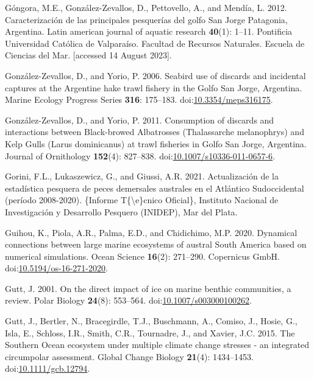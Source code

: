 \documentclass[
]{article}
\newlength{\cslhangindent}
\newenvironment{CSLReferences}[2] %
 {\begin{list}{}{%
  \setlength{\itemindent}{0pt}
  \setlength{\leftmargin}{0pt}
  \setlength{\parsep}{0pt}
  \ifodd #1
   \setlength{\leftmargin}{\cslhangindent}
   \setlength{\itemindent}{-1\cslhangindent}
  \fi
  \setlength{\itemsep}{#2\baselineskip}}}
 {\end{list}}
\begin{document}
\begin{CSLReferences}{1}{0}
Góngora, M.E., González-Zevallos, D., Pettovello, A., and Mendía, L.
2012. Caracterizaci{ó}n de las principales pesquer{í}as del golfo {San
Jorge Patagonia}, {Argentina}. Latin american journal of aquatic
research \textbf{40}(1): 1--11. Pontificia Universidad Cat{ó}lica de
Valpara{í}so. Facultad de Recursos Naturales. Escuela de Ciencias del
Mar. {[}accessed 14 August 2023{]}.

González-Zevallos, D., and Yorio, P. 2006. Seabird use of discards and
incidental captures at the {Argentine} hake trawl fishery in the {Golfo
San Jorge}, {Argentina}. Marine Ecology Progress Series \textbf{316}:
175--183.
doi:\href{https://doi.org/10.3354/meps316175}{10.3354/meps316175}.

González-Zevallos, D., and Yorio, P. 2011. Consumption of discards and
interactions between {Black-browed Albatrosses} ({Thalassarche}
melanophrys) and {Kelp Gulls} ({Larus} dominicanus) at trawl fisheries
in {Golfo San Jorge}, {Argentina}. Journal of Ornithology
\textbf{152}(4): 827--838.
doi:\href{https://doi.org/10.1007/s10336-011-0657-6}{10.1007/s10336-011-0657-6}.

Gorini, F.L., Lukaszewicz, G., and Giussi, A.R. 2021. {Actualizaci{ó}n
de la estad{í}stica pesquera de peces demersales australes en el
Atl{á}ntico Sudoccidental (per{í}odo 2008-2020)}. \{Informe
T\{\textbackslash\textquotesingle e\}cnico Oficial\}, Instituto Nacional
de Investigaci{ó}n y Desarrollo Pesquero (INIDEP), Mar del Plata.

Guihou, K., Piola, A.R., Palma, E.D., and Chidichimo, M.P. 2020.
Dynamical connections between large marine ecosystems of austral {South
America} based on numerical simulations. Ocean Science \textbf{16}(2):
271--290. Copernicus GmbH.
doi:\href{https://doi.org/10.5194/os-16-271-2020}{10.5194/os-16-271-2020}.

Gutt, J. 2001. On the direct impact of ice on marine benthic
communities, a review. Polar Biology \textbf{24}(8): 553--564.
doi:\href{https://doi.org/10.1007/s003000100262}{10.1007/s003000100262}.

Gutt, J., Bertler, N., Bracegirdle, T.J., Buschmann, A., Comiso, J.,
Hosie, G., Isla, E., Schloss, I.R., Smith, C.R., Tournadre, J., and
Xavier, J.C. 2015. The {Southern Ocean} ecosystem under multiple climate
change stresses - an integrated circumpolar assessment. Global Change
Biology \textbf{21}(4): 1434--1453.
doi:\href{https://doi.org/10.1111/gcb.12794}{10.1111/gcb.12794}.


\end{CSLReferences}
\end{document}
